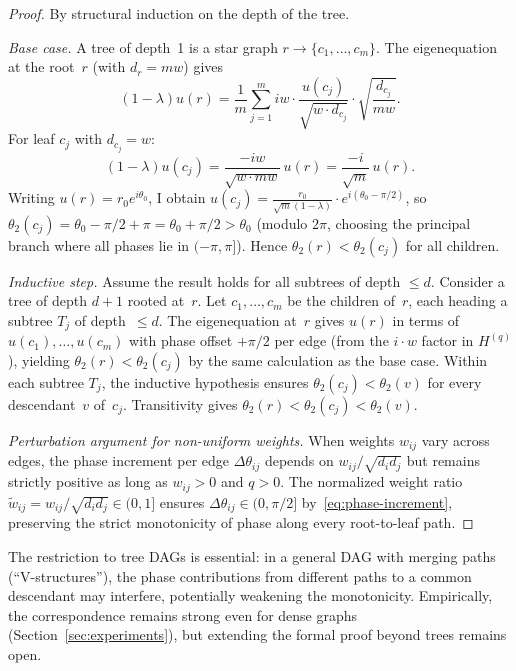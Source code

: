 \documentclass[twoside,11pt]{article}
\begin{document}
\begin{proof}
By structural induction on the depth of the tree.

\emph{Base case.}  A tree of depth~1 is a star graph $r\to\{c_1,\dots,c_m\}$.
The eigenequation at the root~$r$ (with $d_r=mw$) gives
\[
  (1-\lambda)u(r) = \frac{1}{m}\sum_{j=1}^m iw\cdot\frac{u(c_j)}{\sqrt{w\cdot d_{c_j}}}\cdot\sqrt{\frac{d_{c_j}}{mw}}.
\]
For leaf $c_j$ with $d_{c_j}=w$:
\[
  (1-\lambda)u(c_j) = \frac{-iw}{\sqrt{w\cdot mw}}\,u(r)
  = \frac{-i}{\sqrt{m}}\,u(r).
\]
Writing $u(r)=r_0 e^{i\theta_0}$, I obtain
$u(c_j)=\frac{r_0}{\sqrt{m}(1-\lambda)}\cdot e^{i(\theta_0-\pi/2)}$,
so $\theta_2(c_j)=\theta_0-\pi/2+\pi=\theta_0+\pi/2>\theta_0$ (modulo
$2\pi$, choosing the principal branch where all phases lie in
$(-\pi,\pi]$).  Hence $\theta_2(r)<\theta_2(c_j)$ for all children.

\emph{Inductive step.}  Assume the result holds for all subtrees of
depth $\le d$.  Consider a tree of depth $d+1$ rooted at~$r$.  Let
$c_1,\dots,c_m$ be the children of~$r$, each heading a subtree $T_j$ of
depth~$\le d$.  The eigenequation at~$r$ gives $u(r)$ in terms of
$u(c_1),\dots,u(c_m)$ with phase offset $+\pi/2$ per edge (from the
$i\cdot w$ factor in $H^{(q)}$), yielding $\theta_2(r)<\theta_2(c_j)$
by the same calculation as the base case.  Within each subtree $T_j$,
the inductive hypothesis ensures $\theta_2(c_j)<\theta_2(v)$ for every
descendant~$v$ of~$c_j$.  Transitivity gives
$\theta_2(r)<\theta_2(c_j)<\theta_2(v)$.

\emph{Perturbation argument for non-uniform weights.}  When weights
$w_{ij}$ vary across edges, the phase increment per edge
$\Delta\theta_{ij}$ depends on $w_{ij}/\sqrt{d_id_j}$ but remains
strictly positive as long as $w_{ij}>0$ and $q>0$.  The normalized
weight ratio $\tilde{w}_{ij}=w_{ij}/\sqrt{d_id_j}\in(0,1]$ ensures
$\Delta\theta_{ij}\in(0,\pi/2]$ by~\eqref{eq:phase-increment},
preserving the strict monotonicity of phase along every root-to-leaf
path.
\end{proof}

\begin{remark}
The restriction to tree DAGs is essential: in a general DAG with
merging paths (``V-structures''), the phase contributions from
different paths to a common descendant may interfere, potentially
weakening the monotonicity.  Empirically, the correspondence remains
strong even for dense graphs (Section~\ref{sec:experiments}), but
extending the formal proof beyond trees remains open.
\end{remark}

\vskip 0.2in

\end{document}
